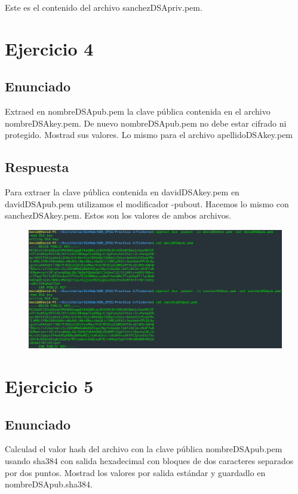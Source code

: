 \documentclass[10pt,a4paper,spanish]{report}
\begin{document}
\noindent
Este es el contenido del archivo sanchezDSApriv.pem.


\chapter{Ejercicio 4}

\section{Enunciado}
\noindent
Extraed en nombreDSApub.pem la clave pública contenida en el archivo nombreDSAkey.pem. De nuevo nombreDSApub.pem no debe estar cifrado ni protegido. Mostrad sus valores. Lo mismo para el archivo apellidoDSAkey.pem

\section{Respuesta}
\noindent
Para extraer la clave pública contenida en davidDSAkey.pem en davidDSApub.pem utilizamos el modificador -pubout. Hacemos lo mismo con sanchezDSAkey.pem.
Estos son los valores de ambos archivos.

\begin{figure}[!hbp]
 \centering  \includegraphics[width=1\textwidth]{./Imagenes/4.png}
\end{figure}

\chapter{Ejercicio 5}

\section{Enunciado}
\noindent
Calculad el valor hash del archivo con la clave pública nombreDSApub.pem usando sha384 con salida hexadecimal con bloques de dos caracteres separados por dos puntos. Mostrad los valores por salida estándar y guardadlo en nombreDSApub.sha384.
\end{document}

